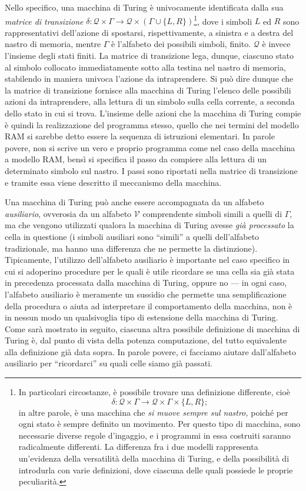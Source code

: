 \documentclass[10pt]{\classname}
\theoremstyle{definition}
\theoremstyle{definition}
\theoremstyle{definition}
\theoremstyle{definition}
\begin{document}
Nello specifico, una macchina di Turing è univocamente identificata dalla sua
\emph{matrice di transizione} $\delta  : \mathcal Q \times \Gamma \rightarrow
\mathcal Q \times (\Gamma \cup \{L,R\})$\footnote{In particolari circostanze, è
possibile trovare una definizione differente, cioè $$\delta  : \mathcal Q \times
\Gamma \rightarrow \mathcal Q \times \Gamma \times \{L,R\};$$ in altre parole, è
una macchina che \emph{si muove sempre sul nastro,} poiché per ogni stato è
sempre definito un movimento. Per questo tipo di macchina, sono necessarie
diverse regole d'ingaggio, e i programmi in essa costruiti saranno radicalmente
differenti. La differenza fra i due modelli rappresenta un'evidenza della
versatilità della macchina di Turing, e della possibilità di introdurla con
varie definizioni, dove ciascuna delle quali possiede le proprie peculiarità.},
dove i simboli $L$ ed $R$ sono rappresentativi dell'azione di spostarsi,
rispettivamente, a sinistra e a destra del nastro di memoria, mentre $\Gamma$ è
l'alfabeto dei possibili simboli, finito. $\mathcal Q$ è invece l'insieme degli
stati finiti. La matrice di transizione lega, dunque, ciascuno stato al simbolo
collocato immediatamente sotto alla testina nel nastro di memoria, stabilendo
in maniera univoca l'azione da intraprendere. Si può dire dunque che la matrice
di transizione fornisce alla macchina di Turing l'elenco delle possibili azioni
da intraprendere, alla lettura di un simbolo sulla cella corrente, a seconda
dello stato in cui si trova. L'insieme delle azioni che la macchina di Turing
compie è quindi la realizzazione del programma stesso, quello che nei termini
del modello RAM si sarebbe detto essere la sequenza di istruzioni elementari.
In parole povere, non si scrive un vero e proprio programma come nel caso della
macchina a modello RAM, bensì si specifica il passo da compiere alla lettura di
un determinato simbolo sul nastro. I passi sono riportati nella matrice di
transizione e tramite essa viene descritto il meccanismo della macchina.

Una macchina di Turing può anche essere accompagnata da un alfabeto
\emph{ausiliario}, ovverosia da un alfabeto $\mathcal V$ comprendente simboli
simili a quelli di $\Gamma$, ma che vengono utilizzati qualora la macchina di
Turing avesse \emph{già processato} la cella in questione (i simboli ausiliari
sono ``simili'' a quelli dell'alfabeto tradizionale, ma hanno una differenza
che ne permette la distinzione). Tipicamente, l'utilizzo dell'alfabeto
ausiliario è importante nel caso specifico in cui si adoperino procedure per le
quali è utile ricordare se una cella sia già stata in precedenza processata
dalla macchina di Turing, oppure no --- in ogni caso, l'alfabeto ausiliario è
meramente un sussidio che permette una semplificazione della procedura o aiuta
ad interpretare il comportamento della macchina, non è in nessun modo un
qualsivoglia tipo di estensione della macchina di Turing. Come sarà mostrato in
seguito, ciascuna altra possibile definizione di macchina di Turing è, dal
punto di vista della potenza computazione, del tutto equivalente alla
definizione già data sopra. In parole povere, ci facciamo aiutare dall'alfabeto
ausiliario per ``ricordarci'' su quali celle siamo già passati.
\end{document}
